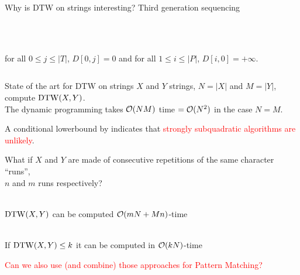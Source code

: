 \begin{frame}{Why is DTW on strings interesting? Third generation sequencing}
\begin{columns}
    \vfill
    \\
    \smallskip
    \\
    for all $0\leq j\leq |T|$, $D[0,j]= 0$ and 
    for all $1 \leq i \leq |P|$, $D[i,0]=+\infty$.\\
    \vfill
    \end{columns}
    \pause
    
\end{frame}

\begin{frame}{State of the art for DTW on strings}
    $X$ and $Y$ strings, $N=|X|$ and $M=|Y|$, compute $\mathrm{DTW}(X,Y)$.\\ \pause
    \smallskip
    The dynamic programming takes $\mathcal{O}(NM)$ time $=\mathcal{O}(N^2)$ in the case $N=M$.\\ \pause

    \medskip
    A conditional lowerbound by  indicates that \textcolor{red}{strongly subquadratic algorithms are unlikely}.\pause
    
    \medskip
    What if $X$ and $Y$ are made of consecutive repetitions of the same character ``runs'',\\ $n$ and $m$ runs respectively?\\ \pause

    \smallskip
     \\
    $\mathrm{DTW}(X,Y)$ can be computed $\mathcal{O}(mN+Mn)$-time  \pause
    
    \smallskip
    \\ \pause
    If $\mathrm{DTW}(X,Y) \leq k$ it can be computed in $\mathcal{O}(kN)$-time  \pause 
    
    \medskip

    \textcolor{red}{Can we also use (and combine) those approaches for Pattern Matching?}

\end{frame}


